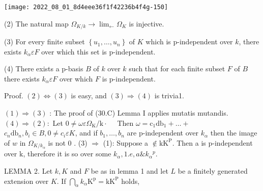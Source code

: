 \texttt{[image: 2022\_08\_01\_8d4eee36f1f42236b4f4g-150]}

(2) The natural map $\Omega_{K / k} \rightarrow \lim _{\leftarrow} \Omega_{K}$ is injective.

(3) For every finite subset $\left\{u_{1}, \ldots, u_{n}\right\}$ of $K$ which is p-independent over $k$, there exists $k_{\alpha} \varepsilon F$ over which this set is $\mathrm{p}$-independent.

(4) There exists a p-basis $B$ of $k$ over $k$ such that for each finite subset $F$ of $B$ there exists $k_{\alpha} \varepsilon F$ over which $F$ is p-independent.

Proof. $(2) \Leftrightarrow(3)$ is easy, and $(3) \Rightarrow(4)$ is trivia1.

$(1) \Rightarrow(3)$ : The proof of (30.C) Lemma I applies mutatis mutandis. $(4) \Rightarrow(2):$ Let $0 \neq \omega \varepsilon \Omega_{\mathrm{K}} / \mathrm{k} \cdot \quad$ Then $\omega=\mathrm{c}_{1} \mathrm{db}_{1}+\ldots+$ $c_{n} \mathrm{db}_{n}, b_{i} \in B, 0 \neq c_{i} \varepsilon K$, and if $b_{1}, \ldots, b_{n}$ are p-independent over $k_{\alpha}$ then the image of $w$ in $\Omega_{K / k_{\alpha}}$ is not 0 . (3) $\Rightarrow$ (1): Suppose a $\notin \mathrm{kK}^{\mathrm{P}}$. Then a is $\mathrm{p}$-independent over $\mathrm{k}$, therefore it is so over some $k_{\alpha}, 1 . e, a \& k_{\alpha}{ }^{p}$.

LEMMA 2. Let $k, K$ and $F$ be as in lemma 1 and let $L$ be a finitely generated extension over $K .$ If $\bigcap_{\alpha} k_{\alpha} \mathrm{K}^{\mathrm{p}}=\mathrm{kK}^{\mathrm{P}}$ holds,

